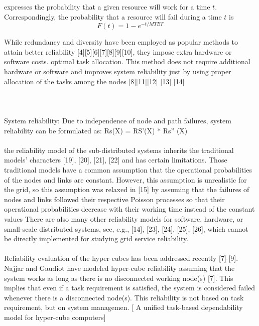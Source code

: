 \documentclass{cslthse-msc}
\begin{document}
 expresses the probability that a given resource will work for a time $t$. Correspondingly, the probability that a resource will fail during a time $t$ is
\begin{equation} \label{eq:resource_failure_prob}
F(t) = 1- e^{-t/MTBF}
\end{equation}

\iffalse
While redundancy and diversity have been employed as popular methods to attain better reliability [4][5][6][7][8][9][10], they impose extra hardware or software costs.
optimal task allocation. This method does not require additional hardware or software and improves system reliability just by using proper allocation of the tasks among the nodes [8][11][12] [13] [14] \cite{optTaskAllocationForMaxRel}
\\\\
\cite{discContRelModel}
\\\\
System reliability: Due to independence of node and path failures, system reliability can be formulated as: Rs(X) = RS’(X) * Rs” (X) \cite{optTaskAllocationForMaxRel}
\\\\
the reliability model of the sub-distributed systems inherits the traditional models’ characters [19], [20], [21], [22] and has certain limitations. Those traditional models have a common assumption that the operational probabilities of the nodes and links are constant. However, this assumption is unrealistic for the grid, so this assumption was relaxed in [15] by assuming that the failures of nodes and links followed their respective Poisson processes so that their operational probabilities decrease with their working time instead of the constant values 
There are also many other reliability models for software, hardware, or small-scale distributed systems, see, e.g., [14], [23], [24], [25], [26], which cannot be directly implemented for studying grid service reliability. \cite{hierarchicalRelModeling}
\\\\
Reliability evaluation of the hyper-cubes has been addressed recently [7]-[9]. Najjar and Gaudiot have modeled hyper-cube reliability assuming that the system works as long as there is no disconnected working node(s) [7]. This implies that even if a task requirement is satisfied, the system is considered failed whenever there is a disconnected node(s). This reliability is not based on task requirement, but on system managemen. [ A unified task-based dependability model for hyper-cube computers]
\end{document}
